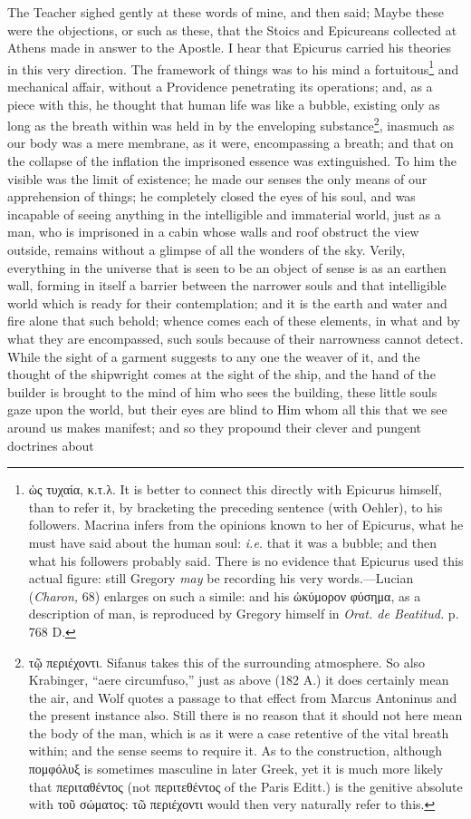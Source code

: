 The Teacher sighed gently at these words of mine, and then said; Maybe these were the objections, or such as these, that the Stoics and Epicureans collected at Athens made in answer to the Apostle. I hear that Epicurus carried his theories in this very direction. The framework of things was to his mind a fortuitous\footnote{\textgreek{ὡς τυχαία, κ.τ.λ}. It is better to connect this directly with Epicurus himself, than to refer it, by bracketing the preceding sentence (with Oehler), to his followers. Macrina infers from the opinions known to her of Epicurus, what he must have said about the human soul: \emph{i.e.} that it was a bubble; and then what his followers probably said. There is no evidence that Epicurus used this actual figure: still Gregory \emph{may} be recording his very words.—Lucian (\emph{Charon,} 68) enlarges on such a simile: and his \textgreek{ὠκύμορον φύσημα}, as a description of man, is reproduced by Gregory himself in \emph{Orat. de Beatitud.} p. 768 D.} and mechanical affair, without a Providence penetrating its operations; and, as a piece with this, he thought that human life was like a bubble, existing only as long as the breath within was held in by the enveloping substance\footnote{\textgreek{τῷ περιέχοντι}. Sifanus takes this of the surrounding atmosphere. So also Krabinger, “aere circumfuso,” just as above (182 A.) it does certainly mean the air, and Wolf quotes a passage to that effect from Marcus Antoninus and the present instance also. Still there is no reason that it should not here mean the body of the man, which is as it were a case retentive of the vital breath within; and the sense seems to require it. As to the construction, although \textgreek{πομφόλυξ} is sometimes masculine in later Greek, yet it is much more likely that \textgreek{περιταθέντος} (not \textgreek{περιτεθέντος} of the Paris Editt.) is the genitive absolute with \textgreek{τοῦ σώματος: τῶ περιέχοντι} would then very naturally refer to this.}, inasmuch as our body was a mere membrane, as it were, encompassing a breath; and that on the collapse of the inflation the imprisoned essence was extinguished. To him the visible was the limit of existence; he made our senses the only means of our apprehension of things; he completely closed the eyes of his soul, and was incapable of seeing anything in the intelligible and immaterial world, just as a man, who is imprisoned in a cabin whose walls and roof obstruct the view outside, remains without a glimpse of all the wonders of the sky. Verily, everything in the universe that is seen to be an object of sense is as an earthen wall, forming in itself a barrier between the narrower souls and that intelligible world which is ready for their contemplation; and it is the earth and water and fire alone that such behold; whence comes each of these elements, in what and by what they are encompassed, such souls because of their narrowness cannot detect. While the sight of a garment suggests to any one the weaver of it, and the thought of the shipwright comes at the sight of the ship, and the hand of the builder is brought to the mind of him who sees the building, these little souls gaze upon the world, but their eyes are blind to Him whom all this that we see around us makes manifest; and so they propound their clever and pungent doctrines about 